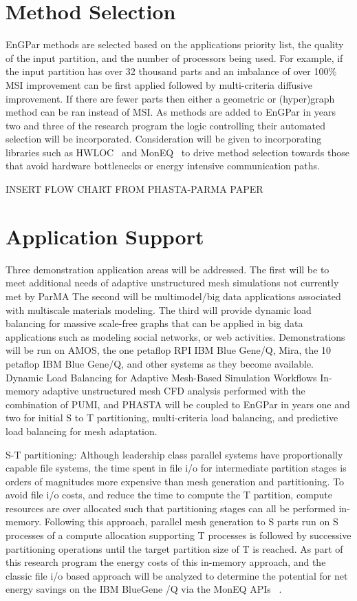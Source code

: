 \documentclass[12pt]{article}
\begin{document}
\section{Method Selection} \label{sec:methodSelection}

EnGPar methods are selected based on the applications priority list, the
quality of the input partition, and the number of processors being used.
For example, if the input partition has over 32 thousand parts and an imbalance
of over 100\% MSI improvement can be first applied followed by multi-criteria
diffusive improvement.
If there are fewer parts then either a geometric or (hyper)graph method can be
ran instead of MSI.
As methods are added to EnGPar in years two and three of the research program
the logic controlling their automated selection will be incorporated.
Consideration will be given to incorporating libraries such as
HWLOC~\cite{broquedis2010hwloc} and MonEQ~\cite{wallace2013measuring} to drive
method selection towards those that avoid hardware bottlenecks or energy
intensive communication paths.


INSERT FLOW CHART FROM PHASTA-PARMA PAPER

\section{Application Support} \label{sec:apps}

Three demonstration application areas will be addressed.
The first will be to meet additional needs of adaptive unstructured mesh
simulations not currently met by ParMA The second will be multimodel/big data
applications associated with multiscale materials modeling.
The third will provide dynamic load balancing for massive scale-free graphs
that can be applied in big data applications such as modeling social networks,
or web activities.
Demonstrations will be run on AMOS, the one petaflop RPI IBM Blue Gene/Q, Mira,
the 10 petaflop IBM Blue Gene/Q, and other systems as they become available.
Dynamic Load Balancing for Adaptive Mesh-Based Simulation Workflows In-memory
adaptive unstructured mesh CFD analysis performed with the combination of
PUMI, and PHASTA will be coupled to EnGPar in years one and two for initial S
to T partitioning, multi-criteria load balancing, and predictive load balancing
for mesh adaptation.

S-T partitioning: Although leadership class parallel systems have proportionally
capable file systems, the time spent in file i/o for intermediate partition stages
is orders of magnitudes more expensive than mesh generation and partitioning.
To avoid file i/o costs, and reduce the time to compute the T partition,
compute resources are over allocated such that partitioning stages can all be
performed in-memory.
Following this approach, parallel mesh generation to S parts run on S processes
of a compute allocation supporting T processes is followed by successive
partitioning operations until the target partition size of T is reached.
As part of this research program the energy costs of this in-memory approach,
and the classic file i/o based approach will be analyzed to determine the
potential for net energy savings on the IBM BlueGene /Q via the MonEQ APIs
~\cite{wallace2013measuring}.
\end{document}
